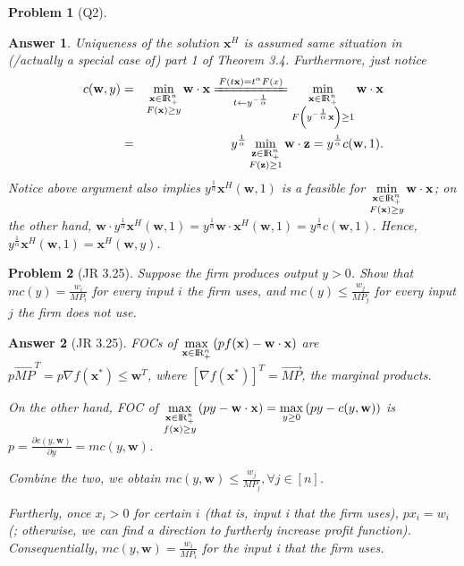 \documentclass{article}
\newtheorem*{ans}{Answer}
\newtheorem*{prob}{{\bf Problem}}
\newcommand {\Reals}  {{\rm I \! R}}
\newcommand{\1}{{\bf 1}}
\newcommand{\0}{{\mathbf{0}}}
\newcommand{\w}{{\mathbf{w}}}
\newcommand{\x}{{\mathbf{x}}}
\newcommand{\z}{{\mathbf{z}}}
\newcommand{\<}{\langle}
\renewcommand{\>}{\rangle}
\newcommand{\dps}{\displaystyle}
\begin{document}
\begin{prob}[Q2]
\end{prob}
\begin{ans} Uniqueness of the solution $\x^H$ is assumed same situation in (/actually a special case of) part 1 of Theorem 3.4.
	Furthermore, just notice
	\begin{eqnarray*}
		c(\w,y) & = & \min_{\substack{ \x \in \Reals_+^n \\ F(\x)  \ge y}} \w \cdot \x \xlongequal[t \leftarrow y^{ - \frac1{\alpha}}]{F(t\x) = t^{\alpha} F(x)} \min_{\substack{ \x \in \Reals_+^n \\ F\left(  y^{ - \frac1{\alpha}}\x\right)  \ge 1}} \w \cdot \x \\
		& = & y^{  \frac1{\alpha}} \min_{\substack{ \z \in \Reals_+^n \\ F\left(  \z \right)  \ge 1}} \w \cdot \z  = y^{  \frac1{\alpha}}c(\w,1).
	\end{eqnarray*}
Notice above argument also implies $y^{  \frac1{\alpha}}\x^H \left(\w,1 \right)$ is a feasible for $\dps \min_{\substack{ \x \in \Reals_+^n \\ F(\x)  \ge y}} \w \cdot \x$; on the other hand, $\w \cdot y^{  \frac1{\alpha}}\x^H \left(\w,1 \right) = y^{  \frac1{\alpha}}\w\cdot \x^H \left(\w,1 \right) = y^{  \frac1{\alpha}} c \left(\w,1 \right)$. Hence, $y^{  \frac1{\alpha}}\x^H \left(\w,1 \right) = \x^H \left(\w, y \right)$.

\end{ans}
\begin{prob}[JR 3.25] Suppose the firm produces output $y > 0$. Show that $mc(y) = \frac{w_i}{MP_i}$ for every input $i$ the firm uses, and $mc(y) \le \frac{w_j}{MP_j}$ for every input $j$ the firm does not use.
\end{prob}
\begin{ans}[JR 3.25]
	FOCs of $\dps \max_{\x \in \Reals_+^n} \left(p f(\x) - \w \cdot \x\right) $ are $p \overrightarrow{MP}^T = p \nabla f(\x^*) \le \w^T$, where $\left[\nabla f(\x^*) \right]^T= \overrightarrow{MP}$, the marginal products.
	
	On the other hand, FOC of $\dps \max_{\substack{\x \in \Reals_+^n \\ f(\x) \ge y}} \left(py - \w \cdot \x\right) = \max_{y \ge 0}\left( py - c(y,\w)\right) $ is
	$p  = \frac{\partial c(y,\w)}{\partial y} = mc(y,\w) $.
	
	Combine the two, we obtain $ mc(y,\w) \le \frac{w_j}{MP_j}, \forall j \in[n]$. 
	
	Furtherly, once $x_i >0$ for certain $i$ (that is, input i that the firm uses), $px_i = w_i$ (; otherwise, we can find a direction to furtherly increase profit function). Consequentially, $mc(y,\w) = \frac{w_i}{MP_i}$ for the input i that the firm uses.
\end{ans}
\end{document}
